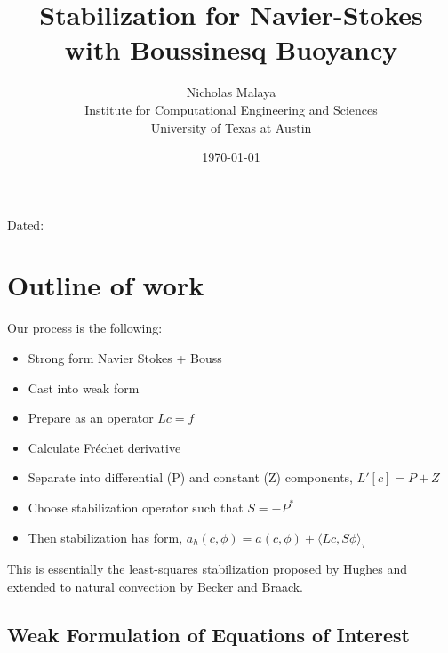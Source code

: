 \documentclass{article}
\title{\bf{Stabilization for Navier-Stokes with Boussinesq Buoyancy}}
\author{Nicholas Malaya \\ Institute for Computational Engineering and
Sciences \\ University of Texas at Austin} \date{}
\begin{document}
\maketitle
\begin{center}
Dated: \date{\today}
\end{center}

\section{Outline of work}
%
%
Our process is the following: 

\begin{itemize}
 \item Strong form Navier Stokes + Bouss
 \item Cast into weak form
 \item Prepare as an operator $Lc=f$
 \item Calculate Fr\'echet derivative
 \item Separate into differential (P) and constant (Z) components,
       $L'[c] = P + Z$
 \item Choose stabilization operator such that $S = -P^*$
 \item Then stabilization has form, $a_h(c,\phi) = a(c,\phi) + \langle
       Lc,S\phi \rangle_\tau$
\end{itemize}

This is essentially the least-squares stabilization proposed by Hughes
and extended to natural convection by Becker and Braack. 

%
%
\newpage

\subsection{Weak Formulation of Equations of Interest}
\end{document}
